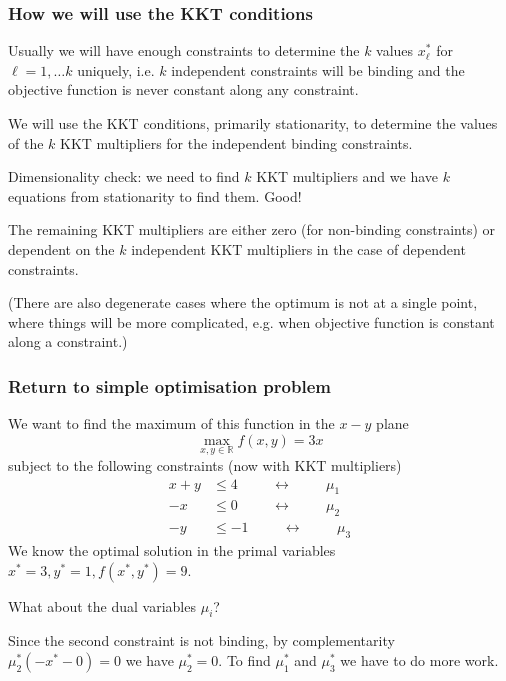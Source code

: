 \documentclass[10pt,aspectratio=169,dvipsnames]{beamer}
\def\m{\mu}
\begin{document}
\begin{frame}
  \frametitle{How we will use the KKT conditions}

  Usually we will have enough constraints to determine the $k$ values
  $x_\ell^*$ for $\ell=1,\dots k$ uniquely, i.e. $k$ independent constraints will be binding and the objective function is never constant along any constraint.

  We will use the KKT conditions, primarily stationarity, to determine
  the values of the $k$ KKT multipliers for the independent binding constraints.

  \alert{Dimensionality check}: we need to find $k$ KKT multipliers and we have $k$ equations from stationarity to find them. Good!

  The remaining KKT multipliers are either zero (for non-binding
  constraints) or dependent on the $k$ independent KKT multipliers in the case of dependent constraints.

  (There are also degenerate cases where the optimum is not at a single point, where things will be more complicated, e.g. when objective function is constant along a constraint.)

\end{frame}

\begin{frame}
  \frametitle{Return to simple optimisation problem}

  We want to find the maximum of this function in the $x-y$ plane
  \begin{equation*}
    \max_{x,y\in \mathbb{R}} f(x,y) = 3x
  \end{equation*}
  subject to the following constraints (now with KKT multipliers)
  \begin{align*}
    x + y & \leq 4  \hspace{1cm}\leftrightarrow\hspace{1cm} \m_1 \\
    -x & \leq 0  \hspace{1cm}\leftrightarrow\hspace{1cm} \m_2\\
    -y & \leq -1  \hspace{1cm}\leftrightarrow\hspace{1cm} \m_3
  \end{align*}
  We know the optimal solution in the \alert{primal variables} $x^* = 3, y^* = 1, f(x^*,y^*) = 9$.

  What about the \alert{dual variables} $\m_i$?

  Since the second constraint is not binding, by complementarity
  $\m_2^*(-x^* - 0) = 0$ we have $\m_2^* = 0$. To find $\m_1^*$ and
  $\m_3^*$ we have to do more work.


\end{frame}
\end{document}
